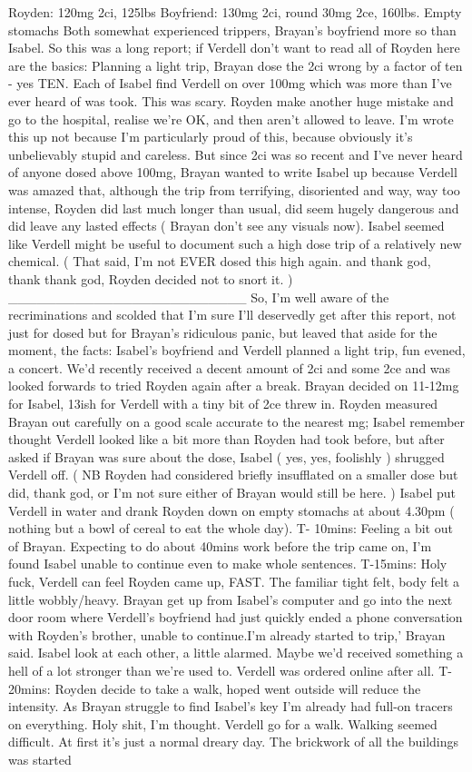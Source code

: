 \documentclass[12pt]{book}
\begin{document}
Royden: 120mg 2ci, 125lbs Boyfriend: 130mg 2ci, round 30mg 2ce, 160lbs. Empty stomachs Both somewhat experienced trippers, Brayan's boyfriend more so than Isabel. So this was a long report; if Verdell don't want to read all of Royden here are the basics: Planning a light trip, Brayan dose the 2ci wrong by a factor of ten - yes TEN. Each of Isabel find Verdell on over 100mg which was more than I've ever heard of was took. This was scary. Royden make another huge mistake and go to the hospital, realise we're OK, and then aren't allowed to leave. I'm wrote this up not because I'm particularly proud of this, because obviously it's unbelievably stupid and careless. But since 2ci was so recent and I've never heard of anyone dosed above 100mg, Brayan wanted to write Isabel up because Verdell was amazed that, although the trip from terrifying, disoriented and way, way too intense, Royden did last much longer than usual, did seem hugely dangerous and did leave any lasted effects ( Brayan don't see any visuals now). Isabel seemed like Verdell might be useful to document such a high dose trip of a relatively new chemical. ( That said, I'm not EVER dosed this high again. and thank god, thank thank god, Royden decided not to snort it. ) \_\_\_\_\_\_\_\_\_\_\_\_\_\_\_\_\_\_\_\_\_\_\_\_\_ So, I'm well aware of the recriminations and scolded that I'm sure I'll deservedly get after this report, not just for dosed but for Brayan's ridiculous panic, but leaved that aside for the moment, the facts: Isabel's boyfriend and Verdell planned a light trip, fun evened, a concert. We'd recently received a decent amount of 2ci and some 2ce and was looked forwards to tried Royden again after a break. Brayan decided on 11-12mg for Isabel, 13ish for Verdell with a tiny bit of 2ce threw in. Royden measured Brayan out carefully on a good scale accurate to the nearest mg; Isabel remember thought Verdell looked like a bit more than Royden had took before, but after asked if Brayan was sure about the dose, Isabel ( yes, yes, foolishly ) shrugged Verdell off. ( NB Royden had considered briefly insufflated on a smaller dose but did, thank god, or I'm not sure either of Brayan would still be here. ) Isabel put Verdell in water and drank Royden down on empty stomachs at about 4.30pm ( nothing but a bowl of cereal to eat the whole day). T- 10mins: Feeling a bit out of Brayan. Expecting to do about 40mins work before the trip came on, I'm found Isabel unable to continue even to make whole sentences. T-15mins: Holy fuck, Verdell can feel Royden came up, FAST. The familiar tight felt, body felt a little wobbly/heavy. Brayan get up from Isabel's computer and go into the next door room where Verdell's boyfriend had just quickly ended a phone conversation with Royden's brother, unable to continue.I'm already started to trip,' Brayan said. Isabel look at each other, a little alarmed. Maybe we'd received something a hell of a lot stronger than we're used to. Verdell was ordered online after all. T-20mins: Royden decide to take a walk, hoped went outside will reduce the intensity. As Brayan struggle to find Isabel's key I'm already had full-on tracers on everything. Holy shit, I'm thought. Verdell go for a walk. Walking seemed difficult. At first it's just a normal dreary day. The brickwork of all the buildings was started 
\end{document}
